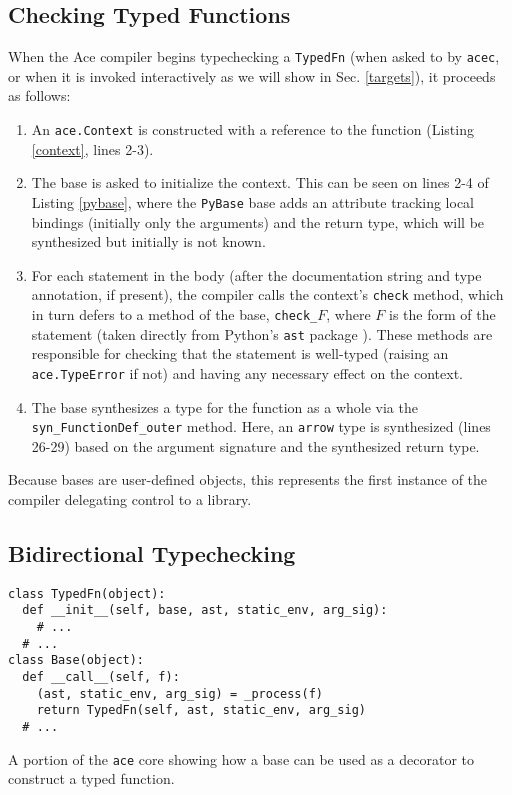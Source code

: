 \documentclass[10pt,preprint]{sigplanconf}
\begin{document}
{\subsection{Checking Typed Functions}
When the Ace compiler begins typechecking a \verb|TypedFn| (when asked to by \verb|acec|, or when it is  invoked interactively as we will show in Sec. \ref{targets}), it proceeds as follows:
\begin{enumerate}
\item An \verb|ace.Context| is constructed with a reference to the function (Listing \ref{context}, lines 2-3).
\item The base is asked to initialize the context. This can be seen on lines 2-4 of Listing \ref{pybase}, where the \verb|PyBase| base adds an attribute tracking local bindings (initially only the arguments) and the return type, which will be synthesized but initially is not known. 
\item For each statement in the body (after the documentation string and type annotation, if present), the compiler calls the context's \verb|check| method, which in turn defers to a method of the base, \verb|check_|$F$, where $F$ is the form of the statement (taken directly from Python's \verb|ast| package \cite{python}). These methods are responsible for checking that the statement is well-typed (raising an \verb|ace.TypeError| if not) and having any necessary effect on the context. 
\item The base synthesizes a type for the function as a whole via the \verb|syn_FunctionDef_outer| method. Here, an \verb|arrow| type is synthesized (lines 26-29) based on the argument signature and the synthesized return type.
\end{enumerate}

Because bases are user-defined objects, this represents the first instance of the compiler delegating control to a library.
\subsection{Bidirectional Typechecking}
\begin{codelisting}
\begin{lstlisting}
class TypedFn(object):
  def __init__(self, base, ast, static_env, arg_sig):
    # ...
  # ...
class Base(object):
  def __call__(self, f):
    (ast, static_env, arg_sig) = _process(f)
    return TypedFn(self, ast, static_env, arg_sig)
  # ...
\end{lstlisting}
\caption{A portion of the \texttt{ace} core showing how a base can be used as a decorator to construct a typed function.}
\label{base}
\end{codelisting}

}
\end{document}
